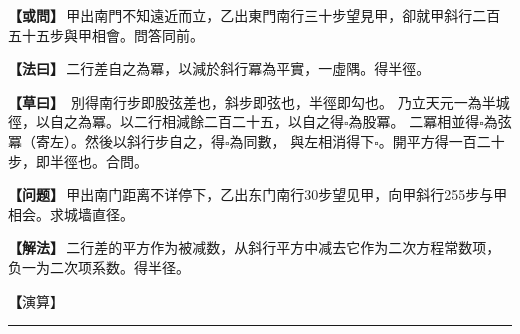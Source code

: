 \documentclass[11pt,a4paper]{article}
\let\origsquare\square
\renewcommand{\square}{\ensuremath{\origsquare}}%
\newcommand{\longline}{\noindent\rule{\textwidth}{0.4pt}}
\newcommand{\clOWEN}[1]{%
  \par\vspace{0.3em}%
  \noindent\textcolor{problemcolor}{\textbf{【或問】}}\,{\tradfont #1}\par\nopagebreak%
}
\newcommand{\mdOWEN}[1]{%
  \par\vspace{0.3em}%
  \noindent\textcolor{problemcolor}{\textbf{【问题】}}\,{\modfont #1}\par\nopagebreak%
}
\newcommand{\clFAYUE}[1]{%
  \par\noindent\textcolor{methodcolor}{\textbf{【法曰】}}\,{\tradfont #1}\par\nopagebreak%
}
\newcommand{\mdFAYUE}[1]{%
  \par\noindent\textcolor{methodcolor}{\textbf{【解法】}}\,{\modfont #1}\par\nopagebreak%
}
\newcommand{\clTSAOYUE}[1]{%
  \par\noindent\textcolor{workcolor}{\textbf{【草曰】}}\,{\tradfont #1}\par%
}
\newcommand{\mdTSAOYUE}[1]{%
  \par\noindent\textcolor{workcolor}{\textbf【演算】}}\,{\modfont #1}\par%
\begin{document}
\begin{paracol}{2}

\begin{leftcolumn}
\clOWEN{甲出南門不知遠近而立，乙出東門南行三十步望見甲，卻就甲斜行二百五十五步與甲相會。問答同前。}

\clFAYUE{二行差自之為冪，以減於斜行冪為平實，一虛隅。得半徑。}

\clTSAOYUE{%
別得南行步即股弦差也，斜步即弦也，半徑即勾也。
乃立天元一為半城徑，以自之為冪。以二行相減餘二百二十五，以自之得$\square$為股冪。
二冪相並得$\square$為弦冪（寄左）。然後以斜行步自之，得$\square$為同數，
與左相消得下$\square$。開平方得一百二十步，即半徑也。合問。}
\end{leftcolumn}

\switchcolumn

\begin{rightcolumn}
\mdOWEN{甲出南门距离不详停下，乙出东门南行30步望见甲，向甲斜行255步与甲相会。求城墙直径。}

\mdFAYUE{二行差的平方作为被减数，从斜行平方中减去它作为二次方程常数项，负一为二次项系数。得半径。}

\mdTSAOYUE{%
辨识得：南行步即为股弦差，斜步即为弦，半径即为勾。
设天元一为半城径，自乘为冪。以二行相减余225，自乘得$\square$为股冪。
二冪相加得$\square$为弦冪（寄左）。然后以斜行步自乘，得$\square$为同数，
与左式相消得下式$\square$。开平方得120步，即半径。符合所问。}
\end{rightcolumn}

\end{paracol}

\vspace{0.3cm}
\begin{center}\longline\end{center}
\end{document}
